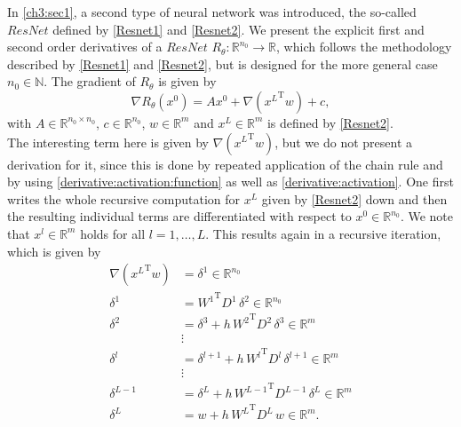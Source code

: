 In \cref{ch3:sec1}, a second type of neural network was introduced, the so-called $ResNet$ defined by \cref{Resnet1} and \cref{Resnet2}. We present the explicit first and second order derivatives of a $ResNet$ $R_{\theta} \colon \mathbb{R}^{n_0} \to \mathbb{R}$, which follows the methodology described by \cref{Resnet1} and \cref{Resnet2}, but is designed for the more general case $n_0 \in \mathbb{N}$. The gradient of $R_{\theta}$ is given by 
\begin{equation}
    \label{ResNetGradientcomplete}
    \nabla R_{\theta} \left( x^0 \right) = A x^0 + \nabla \left( {x^{L}}^{\mathrm{T}} w \right) + c,
\end{equation}
with $A \in \mathbb{R}^{n_0 \times n_0}$, $c \in \mathbb{R}^{n_0}$, $w \in \mathbb{R}^{m}$ and $x^{L} \in \mathbb{R}^{m}$ is defined by \cref{Resnet2}. \\
The interesting term here is given by $\nabla \left( {x^{L}}^{\mathrm{T}} w \right)$, but we do not present a derivation for it, since this is done by repeated application of the chain rule and by using \cref{derivative:activation:function} as well as \cref{derivative:activation}. One first writes the whole recursive computation for $x^{L}$ given by \cref{Resnet2} down and then the resulting individual terms are differentiated with respect to $x^0 \in \mathbb{R}^{n_0}$. We note that $x^l \in \mathbb{R}^{m}$ holds for all $l = 1, \ldots, L$. This results again in a recursive iteration, which is given by 
\begin{equation}
    \label{ResNetgradient}
    \begin{aligned}
        \nabla \left( {x^{L}}^{\mathrm{T}} w \right) & = \delta^{1} \in \mathbb{R}^{n_0}  \\
        \delta^{1} & = {W^{1}}^{\mathrm{T}} D^{1} \, \delta^{2} \in \mathbb{R}^{n_0} \\
        \delta^{2} & = \delta^{3} + h \, {W^{2}}^{\mathrm{T}} D^{2} \, \delta^{3} \in \mathbb{R}^{m} \\
        &\vdots\\
        \delta^{l} & = \delta^{l+1} + h \, {W^{l}}^{\mathrm{T}} D^{l} \, \delta^{l+1} \in \mathbb{R}^{m} \\
        &\vdots\\
        \delta^{L-1} & = \delta^{L} + h \, {W^{L-1}}^{\mathrm{T}} D^{L-1} \, \delta^{L} \in \mathbb{R}^{m} \\
        \delta^{L} & = w + h \, {W^{L}}^{\mathrm{T}} D^{L} \, w \in \mathbb{R}^{m}.
    \end{aligned}   
\end{equation}

